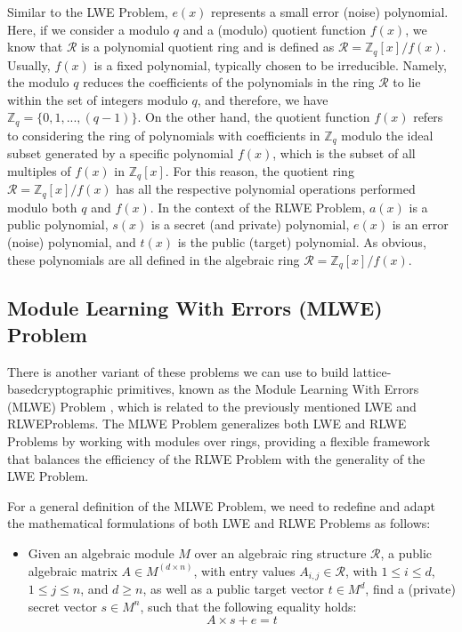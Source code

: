 \documentclass[runningheads]{llncs}
\numberwithin{equation}{section}
\begin{document}
    \noindent Similar to the LWE Problem, $e(x)$ represents a small error (noise) polynomial. Here, if we consider a modulo $q$ and a (modulo) quotient function $f(x)$, we know that $\mathcal{R}$ is a polynomial quotient ring and is defined as $\mathcal{R} = {\mathbb{Z}}_{q}[x]/f(x)$. Usually, $f(x)$ is a fixed polynomial, typically chosen to be irreducible. Namely, the modulo $q$ reduces the coefficients of the polynomials in the ring $\mathcal{R}$ to lie within the set of integers modulo $q$, and therefore, we have ${\mathbb{Z}}_{q} = \{ 0, 1, ..., (q - 1) \}$. On the other hand, the quotient function $f(x)$ refers to considering the ring of polynomials with coefficients in ${\mathbb{Z}}_{q}$ modulo the ideal subset generated by a specific polynomial $f(x)$, which is the subset of all multiples of $f(x)$ in ${\mathbb{Z}}_{q}[x]$. For this reason, the quotient ring $\mathcal{R} = {\mathbb{Z}}_{q}[x]/f(x)$ has all the respective polynomial operations performed modulo both $q$ and $f(x)$. In the context of the RLWE Problem, $a(x)$ is a public polynomial, $s(x)$ is a secret (and private) polynomial, $e(x)$ is an error (noise) polynomial, and $t(x)$ is the public (target) polynomial. As obvious, these polynomials are all defined in the algebraic ring $\mathcal{R} = {\mathbb{Z}}_{q}[x]/f(x)$.
    

    \vspace{-1ex}
    \subsection{Module Learning With Errors (MLWE) Problem}
    \label{subsec:module-learning-with-errors-problem}

    There is another variant of these problems we can use to build lattice-based\break cryptographic primitives, known as the Module Learning With Errors (MLWE) Problem \cite{brakerski-gentry-vaikuntanathan:leveled-fully-homomorphic-encryption-without-bootstrapping:2012:06-2024,langlois-stehle:worst-case-average-case-reduction-module-lattices:2015:06-2024}, which is related to the previously mentioned LWE and RLWE\break Problems. The MLWE Problem generalizes both LWE and RLWE Problems by working with modules over rings, providing a flexible framework that balances the efficiency of the RLWE Problem with the generality of the LWE Problem.

    \vspace{2ex}

    \noindent For a general definition of the MLWE Problem, we need to redefine and adapt the mathematical formulations of both LWE and RLWE Problems as follows:
    \begin{itemize}
        \item Given an algebraic module $M$ over an algebraic ring structure $\mathcal{R}$, a public algebraic matrix $A \in {M}^{(d \times n)}$, with entry values ${A}_{i,j} \in \mathcal{R}$, with $1 \leq i \leq d$, $1 \leq j \leq n$, and $d \geq n$, as well as a public target vector $t \in {M}^{d}$, find a (private) secret vector $s \in {M}^{n}$, such that the following equality holds:
        $$ A \times s + e = t $$
    \end{itemize}
    
\end{document}
